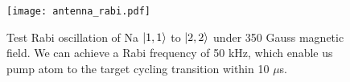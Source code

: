 \begin{figure}[htb]
\begin{center}
\texttt{[image: antenna\_rabi.pdf]}
\end{center}
\caption[Test Rabi oscillation of Na $\ket{1,1}$ to $\ket{2,2}$ under 350 Gauss magnetic field]{Test Rabi oscillation of Na $\ket{1,1}$ to $\ket{2,2}$ under 350 Gauss magnetic field. We can achieve a Rabi frequency of 50 kHz, which enable us pump atom to the target cycling transition within 10 $\mu$s.}  
\label{antenna_rabi}
\end{figure}

\chapterend